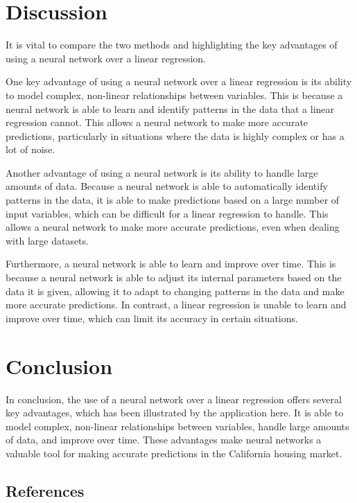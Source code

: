 \documentclass[11pt]{article}
\begin{document}
\section{Discussion}
It is vital to compare the two methods and highlighting the key advantages of using a neural network over a linear regression.

One key advantage of using a neural network over a linear regression is its ability to model complex, non-linear relationships between variables. This is because a neural network is able to learn and identify patterns in the data that a linear regression cannot. This allows a neural network to make more accurate predictions, particularly in situations where the data is highly complex or has a lot of noise.

Another advantage of using a neural network is its ability to handle large amounts of data. Because a neural network is able to automatically identify patterns in the data, it is able to make predictions based on a large number of input variables, which can be difficult for a linear regression to handle. This allows a neural network to make more accurate predictions, even when dealing with large datasets.

Furthermore, a neural network is able to learn and improve over time. This is because a neural network is able to adjust its internal parameters based on the data it is given, allowing it to adapt to changing patterns in the data and make more accurate predictions. In contrast, a linear regression is unable to learn and improve over time, which can limit its accuracy in certain situations.


\section{Conclusion}
In conclusion, the use of a neural network over a linear regression offers several key advantages, which has been illustrated by the application here. It is able to model complex, non-linear relationships between variables, handle large amounts of data, and improve over time. These advantages make neural networks a valuable tool for making accurate predictions in the California housing market.

\subsection{References}

\nocite{Cetkovic2018, Geron2022, Pow2014}
\end{document}

